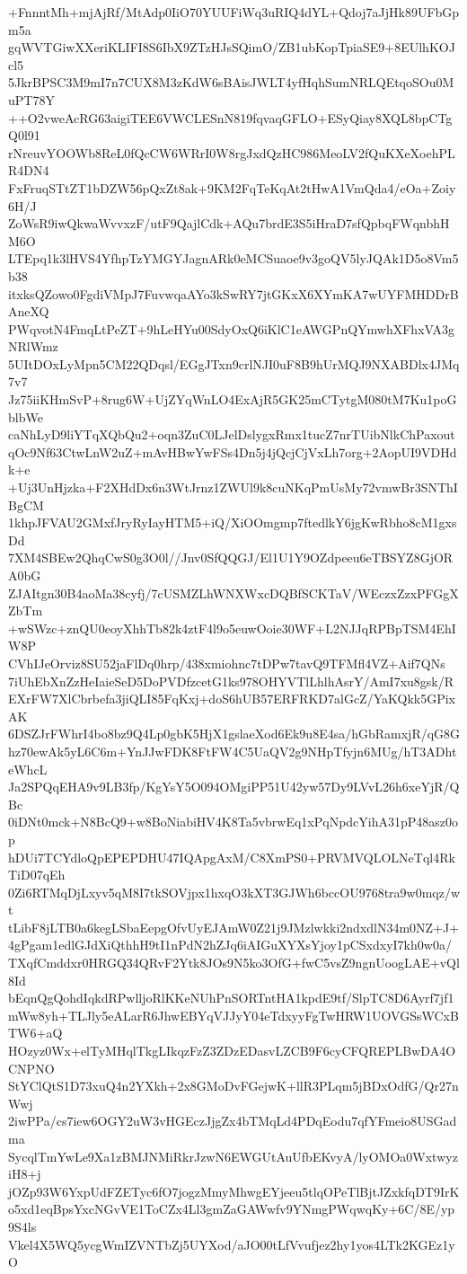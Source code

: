 +FnnntMh+mjAjRf/MtAdp0IiO70YUUFiWq3uRIQ4dYL+Qdoj7aJjHk89UFbGpm5a
gqWVTGiwXXeriKLIFI8S6IbX9ZTzHJsSQimO/ZB1ubKopTpiaSE9+8EUlhKOJcl5
5JkrBPSC3M9mI7n7CUX8M3zKdW6sBAisJWLT4yfHqhSumNRLQEtqoSOu0MuPT78Y
++O2vweAcRG63aigiTEE6VWCLESnN819fqvaqGFLO+ESyQiay8XQL8bpCTgQ0l91
rNreuvYOOWb8ReL0fQcCW6WRrI0W8rgJxdQzHC986MeoLV2fQuKXeXoehPLR4DN4
FxFruqSTtZT1bDZW56pQxZt8ak+9KM2FqTeKqAt2tHwA1VmQda4/eOa+Zoiy6H/J
ZoWsR9iwQkwaWvvxzF/utF9QajlCdk+AQu7brdE3S5iHraD7sfQpbqFWqnbhHM6O
LTEpq1k3lHVS4YfhpTzYMGYJagnARk0eMCSuaoe9v3goQV5lyJQAk1D5o8Vm5b38
itxksQZowo0FgdiVMpJ7FuvwqaAYo3kSwRY7jtGKxX6XYmKA7wUYFMHDDrBAneXQ
PWqvotN4FmqLtPeZT+9hLeHYu00SdyOxQ6iKlC1eAWGPnQYmwhXFhxVA3gNRlWmz
5UItDOxLyMpn5CM22QDqsl/EGgJTxn9crlNJI0uF8B9hUrMQJ9NXABDlx4JMq7v7
Jz75iiKHmSvP+8rug6W+UjZYqWnLO4ExAjR5GK25mCTytgM080tM7Ku1poGblbWe
caNhLyD9liYTqXQbQu2+oqn3ZuC0LJelDslygxRmx1tucZ7nrTUibNlkChPaxout
qOc9Nf63CtwLnW2uZ+mAvHBwYwFSs4Dn5j4jQcjCjVxLh7org+2AopUI9VDHdk+e
+Uj3UnHjzka+F2XHdDx6n3WtJrnz1ZWUl9k8cuNKqPmUsMy72vmwBr3SNThIBgCM
1khpJFVAU2GMxfJryRyIayHTM5+iQ/XiOOmgmp7ftedlkY6jgKwRbho8cM1gxsDd
7XM4SBEw2QhqCwS0g3O0l//Jnv0SfQQGJ/El1U1Y9OZdpeeu6eTBSYZ8GjORA0bG
ZJAItgn30B4aoMa38cyfj/7cUSMZLhWNXWxcDQBfSCKTaV/WEczxZzxPFGgXZbTm
+wSWzc+znQU0eoyXhhTb82k4ztF4l9o5euwOoie30WF+L2NJJqRPBpTSM4EhIW8P
CVhIJeOrviz8SU52jaFlDq0hrp/438xmiohnc7tDPw7tavQ9TFMfl4VZ+Aif7QNs
7iUhEbXnZzHeIaieSeD5DoPVDfzcetG1ks978OHYVTlLhlhAsrY/AmI7xu8gsk/R
EXrFW7XlCbrbefa3jiQLI85FqKxj+doS6hUB57ERFRKD7alGcZ/YaKQkk5GPixAK
6DSZJrFWhrI4bo8bz9Q4Lp0gbK5HjX1gslaeXod6Ek9u8E4sa/hGbRamxjR/qG8G
hz70ewAk5yL6C6m+YnJJwFDK8FtFW4C5UaQV2g9NHpTfyjn6MUg/hT3ADhteWhcL
Ja2SPQqEHA9v9LB3fp/KgYsY5O094OMgiPP51U42yw57Dy9LVvL26h6xeYjR/QBc
0iDNt0mck+N8BcQ9+w8BoNiabiHV4K8Ta5vbrwEq1xPqNpdcYihA31pP48asz0op
hDUi7TCYdloQpEPEPDHU47IQApgAxM/C8XmPS0+PRVMVQLOLNeTql4RkTiD07qEh
0Zi6RTMqDjLxyv5qM8I7tkSOVjpx1hxqO3kXT3GJWh6bccOU9768tra9w0mqz/wt
tLibF8jLTB0a6kegLSbaEepgOfvUyEJAmW0Z21j9JMzlwkki2ndxdlN34m0NZ+J+
4gPgam1edlGJdXiQthhH9tI1nPdN2hZJq6iAIGuXYXsYjoy1pCSxdxyI7kh0w0a/
TXqfCmddxr0HRGQ34QRvF2Ytk8JOs9N5ko3OfG+fwC5vsZ9ngnUoogLAE+vQl8Id
bEqnQgQohdIqkdRPwlljoRlKKeNUhPnSORTntHA1kpdE9tf/SlpTC8D6Ayrf7jf1
mWw8yh+TLJly5eALarR6JhwEBYqVJJyY04eTdxyyFgTwHRW1UOVGSsWCxBTW6+aQ
HOzyz0Wx+elTyMHqlTkgLIkqzFzZ3ZDzEDasvLZCB9F6cyCFQREPLBwDA4OCNPNO
StYClQtS1D73xuQ4n2YXkh+2x8GMoDvFGejwK+llR3PLqm5jBDxOdfG/Qr27nWwj
2iwPPa/cs7iew6OGY2uW3vHGEczJjgZx4bTMqLd4PDqEodu7qfYFmeio8USGadma
SycqlTmYwLe9Xa1zBMJNMiRkrJzwN6EWGUtAuUfbEKvyA/lyOMOa0WxtwyziH8+j
jOZp93W6YxpUdFZETyc6fO7jogzMmyMhwgEYjeeu5tlqOPeTlBjtJZxkfqDT9IrK
o5xd1eqBpsYxcNGvVE1ToCZx4Ll3gmZaGAWwfv9YNmgPWqwqKy+6C/8E/yp9S4ls
Vkel4X5WQ5ycgWmIZVNTbZj5UYXod/aJO00tLfVvufjez2hy1yos4LTk2KGEz1yO
